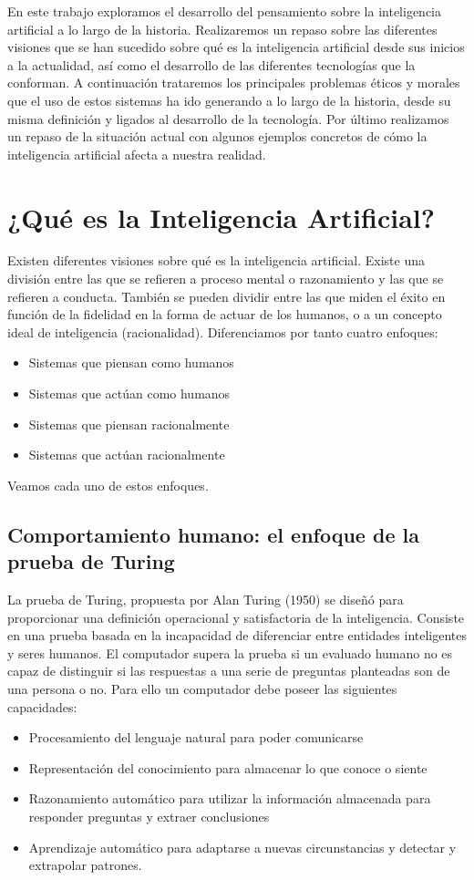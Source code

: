\documentclass[12pt,a4paper]{article}
\begin{document}
En este trabajo exploramos el desarrollo del pensamiento sobre la inteligencia artificial a lo largo de la historia. Realizaremos un repaso sobre las diferentes visiones que se han sucedido sobre qué es la inteligencia artificial desde sus inicios a la actualidad, así como el desarrollo de las diferentes tecnologías que la conforman. A continuación trataremos los principales problemas éticos y morales que el uso de estos sistemas ha ido generando a lo largo de la historia, desde su misma definición y ligados al desarrollo de la tecnología. Por último realizamos un repaso de la situación actual con algunos ejemplos concretos de cómo la inteligencia artificial afecta a nuestra realidad.

\section{¿Qué es la Inteligencia Artificial?}

Existen diferentes visiones sobre qué es la inteligencia artificial. Existe una división entre las que se refieren a proceso mental o razonamiento y las que se refieren a conducta. También se pueden dividir entre las que miden el éxito en función de la fidelidad en la forma de actuar de los humanos, o a un concepto ideal de inteligencia (racionalidad). Diferenciamos por tanto cuatro enfoques:

\begin{itemize}
\item Sistemas que piensan como humanos
\item Sistemas que actúan como humanos
\item Sistemas que piensan racionalmente
\item Sistemas que actúan racionalmente
\end{itemize}
Veamos cada uno de estos enfoques.

\subsection{Comportamiento humano: el enfoque de la prueba de Turing}

La prueba de Turing, propuesta por Alan Turing (1950) se diseñó para proporcionar una definición operacional y satisfactoria de la inteligencia. Consiste en una prueba basada en la incapacidad de diferenciar entre entidades inteligentes y seres humanos. El computador supera la prueba si un evaluado humano no es capaz de distinguir si las respuestas a una serie de preguntas planteadas son de una persona o no. Para ello un computador debe poseer las siguientes capacidades:
\begin{itemize}
\item Procesamiento del lenguaje natural para poder comunicarse
\item Representación del conocimiento para almacenar lo que conoce o siente
\item Razonamiento automático para utilizar la información almacenada para responder preguntas y extraer conclusiones
\item Aprendizaje automático para adaptarse a nuevas circunstancias y detectar y extrapolar patrones.
\end{itemize}
\end{document}
